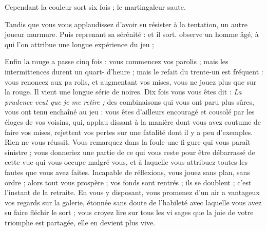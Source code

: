 Cependant la couleur sort six fois ;
le martingaleur saute. 

Tandis que vous vous applaudissez
d'avoir su résister à la tentation, un
autre joueur murmure.  Puis reprenant sa sérénité :
 et il sort.  observe
un homme âgé, à qui l'on attribue une
longue expérience du jeu ; 

Enfin la rouge a passe cinq fois :
vous commencez vos parolis ; mais
les intermittences durent un quart-%
d'heure ; mais le refait du trente-un
est fréquent : vous renoncez aux pa%
rolis, et augmentant vos mises, vous
ne jouez plus que sur la rouge. Il vient
une longue série de noires. Dix fois
vous vous êtes dit : \emph{La prudence veut
que je me retire ;} des combinaisons
qui vous ont paru plus sûres, vous
ont tenu enchaîné au jeu : vous êtes
d'ailleurs encouragé et cousolé par
les éloges de vos voisins, qui, applau%
dissant à la manière dont vous avez
coutume de faire vos mises, rejettent
vos pertes sur une fatalité dont il y a
peu d'exemples. Rien ne vous réussit.
Vous remarquez dans la foule une fi%
gure qui vous paraît sinistre ; vous
donneriez une partie de ce qui vous
reste pour être débarrassé de cette
vue qui vous occupe malgré vous, et
à laquelle vous attribuez toutes les
fautes que vous avez faites. Incapable
de réflexions, vous jouez sans plan,
sans ordre ; alors tout vous prospère ;
vos fonds sont rentrés ; ils se doublent ;
c'est l'instant de la retraite. En vous y
disposant, vous promenez d'un air a%
vantageux vos regards sur la galerie,
étonnée sans doute de l'habileté avec
laquelle vous avez su faire fléchir le
sort ; vous croyez lire sur tous les vi%
sages que la joie de votre triomphe
est partagée, elle en devient plus
vive.

